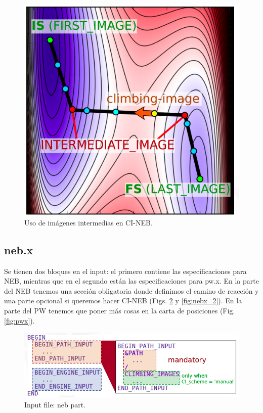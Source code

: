   \begin{figure}[H]
      \centering
      \includegraphics[scale = 0.4]{figs/D3/climb.png}
      \caption{Uso de imágenes intermedias en CI-NEB.}
      \label{fig:climb}
  \end{figure}

\subsection{neb.x}

  Se tienen dos bloques en el input: el primero contiene las especificaciones para NEB, mientras que en el segundo están las especificaciones para pw.x. En la parte del NEB tenemos una sección obligatoria donde definimos el camino de reacción y una parte opcional si queremos hacer CI-NEB (Figs. \ref{fig:nebx} y \ref{fig:nebx_2}). En la parte del PW tenemos que poner más cosas en la carta de posiciones (Fig. \ref{fig:pwx}).

  \begin{figure}[H]
      \centering
      \includegraphics[scale = 0.4]{figs/D3/nebx.png}
      \caption{Input file: neb part.}
      \label{fig:nebx}
  \end{figure}

